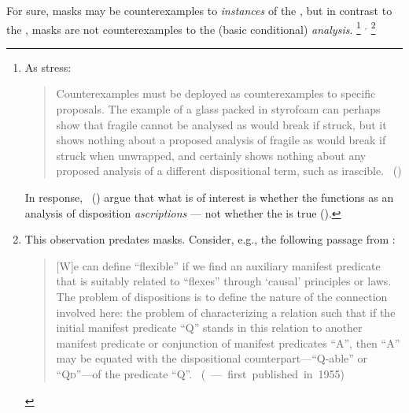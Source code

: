 \begin{note}
  For sure, masks may be counterexamples to \emph{instances} of the \dBCAa{}, but in contrast to the \dSCAa{}, masks are not counterexamples to the (basic conditional) \emph{analysis}.%
  \footnote{
    As \citeauthor{Bonevac:2011tz} stress:
    \begin{quote}
      Counterexamples must be deployed as counterexamples to specific proposals.
      The example of a glass packed in styrofoam can perhaps show that fragile cannot be analysed as would break if struck, but it shows nothing about a proposed analysis of fragile as would break if struck when unwrapped, and certainly shows nothing about any proposed analysis of a different dispositional term, such as irascible.%
      \mbox{ }\hfill\mbox{(\citeyear[1144]{Bonevac:2011tz})}
    \end{quote}
    \nocite{Manley:2007aa}
    In response,~\citeauthor{Manley:2011aa} (\citeyear{Manley:2011aa}) argue that what is of interest is whether the  functions as an analysis of disposition \emph{ascriptions} --- not whether the  is true (\citeyear[cf.][\S1.3]{Manley:2011aa}).
  }%
  \(^{,}\)%
  \footnote{
    This observation predates masks.
    Consider, e.g., the following passage from \citeauthor{Goodman:1983aa}:

    \begin{quote}
      [W]e can define ``flexible'' if we find an auxiliary manifest predicate that is suitably related to ``flexes'' through `causal' principles or laws.
      The problem of dispositions is to define the nature of the connection involved here:
      the problem of characterizing a relation such that if the initial manifest predicate ``Q'' stands in this relation to another manifest predicate or conjunction of manifest predicates ``A'', then ``A'' may be equated with the dispositional counterpart---``Q-able'' or ``Q\textsc{d}''---of the predicate ``Q''.\nolinebreak
      \mbox{ }\hfill\mbox{(\citeyear[45]{Goodman:1983aa} --- first published in 1955)}
    \end{quote}
  }
\end{note}


